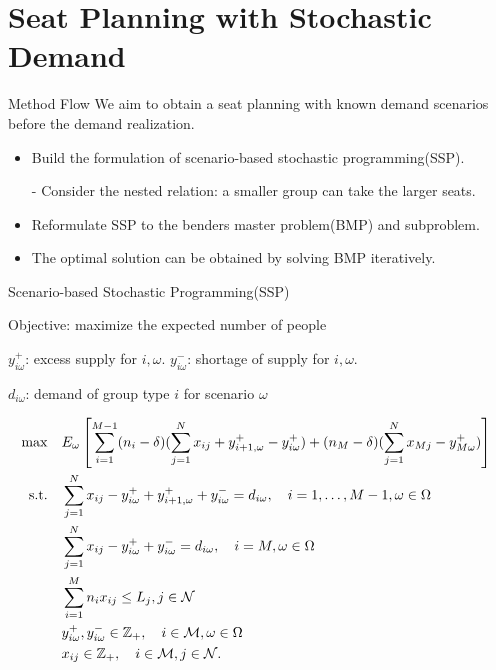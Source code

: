 
\section{Seat Planning with Stochastic Demand}
    \frame{\sectionpage}

    \begin{frame}{Method Flow}
      We aim to obtain a seat planning with known demand scenarios before the demand realization.
      \begin{itemize}
        \item Build the formulation of scenario-based stochastic programming(SSP).
        \item[-] Consider the nested relation: a smaller group can take the larger seats.
        \item Reformulate SSP to the benders master problem(BMP) and subproblem.
        \item The optimal solution can be obtained by solving BMP iteratively. 
      \end{itemize}
    \end{frame}

    \begin{frame}{Scenario-based Stochastic Programming(SSP)}
      \begin{scriptsize}
        Objective: maximize the expected number of people

        $y_{i \omega}^{+}$: excess supply for $i, \omega$. $y_{i \omega}^{-}$: shortage of supply for $i, \omega$.

        $d_{i \omega}$: demand of group type $i$ for scenario $\omega$

      \begin{equation}\label{sto_form}
        \begin{aligned}
        \hspace{-10mm}
        \max \quad & E_{\omega}\left[\sum_{i=1}^{M-1} (n_i-\delta) (\sum_{j= 1}^{N} x_{ij} + y_{i+1,\omega}^{+} - y_{i \omega}^{+}) + (n_{M}-\delta) (\sum_{j= 1}^{N} x_{Mj} - y_{M \omega}^{+})\right] \\
        \text {s.t.} \quad & \sum_{j= 1}^{N} x_{ij}-y_{i \omega}^{+}+
        y_{i+1, \omega}^{+} + y_{i \omega}^{-}=d_{i \omega}, \quad i = 1,\ldots,M-1, \omega \in \Omega \\
        & \sum_{j= 1}^{N} x_{ij} -y_{i \omega}^{+}+y_{i \omega}^{-}=d_{i \omega}, \quad i = M, \omega \in \Omega \\
        & \sum_{i=1}^{M} n_{i} x_{ij} \leq L_j, j \in \mathcal{N}\\
        & y_{i \omega}^{+}, y_{i \omega}^{-} \in \mathbb{Z}_{+}, \quad i \in \mathcal{M}, \omega \in \Omega \\
        & x_{ij} \in \mathbb{Z}_{+}, \quad i \in \mathcal{M}, j \in \mathcal{N}.
        \end{aligned}
      \end{equation}
      \end{scriptsize}
    
    \end{frame}

